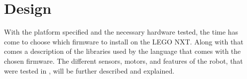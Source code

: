 \chapter{Design} \label{cha:design}

With the platform specified and the necessary hardware tested, the time has come to choose which firmware to install on the LEGO NXT. Along with that comes a description of the libraries used by the language that comes with the chosen firmware. The different sensors, motors, and features of the robot, that were tested in , will be further described and explained.









